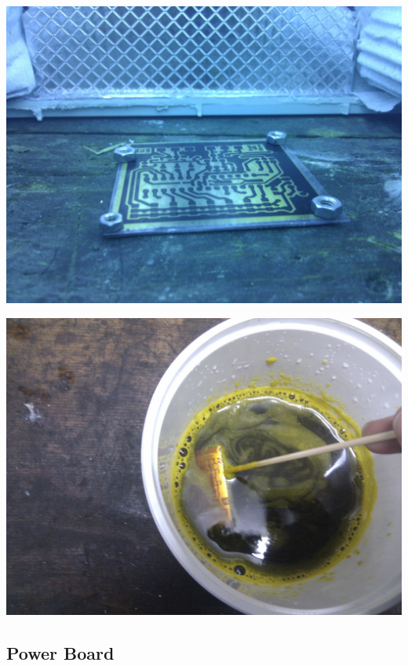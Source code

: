 \documentclass[pdf]{beamer}
\begin{document}
\begin{frame}
  \begin{center}
  \includegraphics[width = \textwidth]{pics/raw/servoboard_ligt2.jpg}
  \end{center}
\end{frame}

\begin{frame}
  \begin{center}
  \includegraphics[width = \textwidth]{pics/raw/sensorboard_etch.jpg}
  \end{center}
\end{frame}
\subsection{Power Board}
\end{document}
